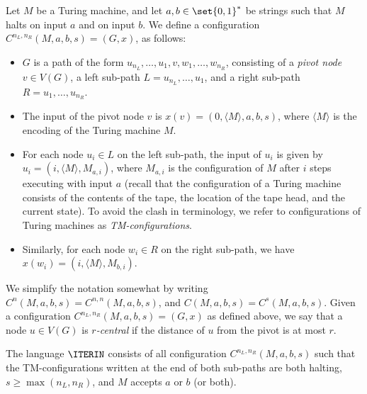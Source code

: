 Let $M$ be a Turing machine,
and let $a,b \in \set{0,1}^*$ be strings such that $M$ halts on input $a$ and on input $b$.
We define a configuration $C^{n_L, n_R}({M,a,b, s}) = (G, x)$, as follows:
\begin{itemize}
	\item $G$ is a path of the form $u_{n_L},\ldots,u_1,v,w_1,\ldots,w_{n_R}$,
		consisting of a \emph{pivot node} $v \in V(G)$,
		a left sub-path $L = u_{n_L},\ldots,u_{1}$,
		and a right sub-path $R = u_1,\ldots,u_{n_R}$.
	\item The input of the pivot node $v$ is $x(v) = (0, \langle M \rangle, a, b, s )$,
		where $\langle M \rangle$ is the encoding of the Turing machine $M$.
	\item For each node $u_i \in L$ on the left sub-path, the input of $u_i$
		is given by $u_i = (i, \langle M \rangle, M_{a,i} )$,
		where $M_{a,i}$ is the configuration of $M$ after $i$ steps
		executing with input $a$
		(recall that the configuration of a Turing machine
		consists of the contents of the tape, the location of the tape head,
		and the current state).
		To avoid the clash in terminology, we refer to configurations of Turing machines
		as \emph{TM-configurations}.
	\item Similarly, for each node $w_i \in R$ on the right sub-path,
		we have $x(w_i) = (i, \langle M \rangle, M_{b,i} )$.
\end{itemize}

We simplify the notation somewhat by writing $C^n(M,a,b,s) = C^{n,n}(M,a,b,s)$,
and $C(M,a,b,s) = C^s(M,a,b,s)$.
Given a configuration $C^{n_L, n_R}({M,a,b,s}) = (G, x)$ as defined above,
we say that a node $u \in V(G)$ is \emph{$r$-central} if the distance of $u$
from the pivot is at most $r$.

The language $\ITERIN$ consists of all configuration $C^{n_L,n_R}(M,a,b,s)$ such that
	the TM-configurations written at the end of both sub-paths are both halting,
	$s \geq \max(n_L, n_R)$,
	and $M$ accepts $a$ or $b$ (or both).

